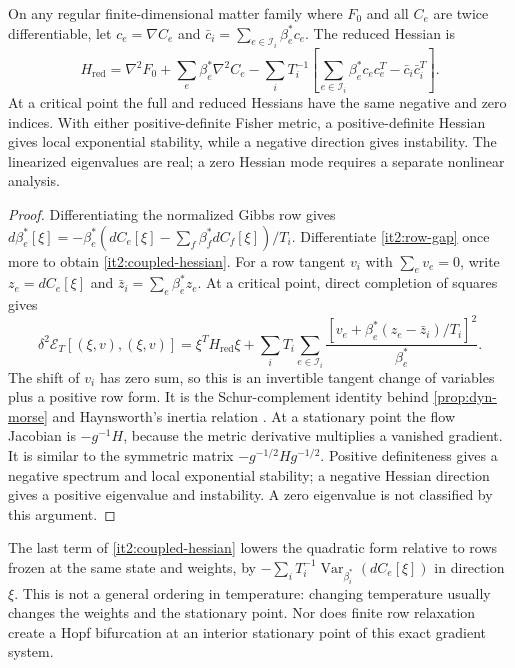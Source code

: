 On any regular finite-dimensional matter family where $F_0$ and all $C_e$ are twice differentiable, let $c_e=\nabla C_e$ and $\bar c_i=\sum_{e\in\mathcal I_i}\beta_e^*c_e$. The reduced Hessian is
\begin{equation}
 H_{\mathrm{red}}=\nabla^2F_0+\sum_e\beta_e^*\nabla^2C_e
 -\sum_iT_i^{-1}\left[
       \sum_{e\in\mathcal I_i}\beta_e^*c_ec_e^T-\bar c_i\bar c_i^T\right].
 \label{it2:coupled-hessian}
\end{equation}
At a critical point the full and reduced Hessians have the same negative and zero indices. With either positive-definite Fisher metric, a positive-definite Hessian gives local exponential stability, while a negative direction gives instability. The linearized eigenvalues are real; a zero Hessian mode requires a separate nonlinear analysis.
\begin{proof}
Differentiating the normalized Gibbs row gives $d\beta_e^*[\xi]=-\beta_e^*(dC_e[\xi]-\sum_f\beta_f^*dC_f[\xi])/T_i$. Differentiate \cref{it2:row-gap} once more to obtain \cref{it2:coupled-hessian}. For a row tangent $v_i$ with $\sum_ev_e=0$, write $z_e=dC_e[\xi]$ and $\bar z_i=\sum_e\beta_e^*z_e$. At a critical point, direct completion of squares gives
\begin{equation}
 \delta^2\mathcal E_T[(\xi,v),(\xi,v)]
 =\xi^TH_{\mathrm{red}}\xi
  +\sum_iT_i\sum_{e\in\mathcal I_i}
       \frac{[v_e+\beta_e^*(z_e-\bar z_i)/T_i]^2}{\beta_e^*}.
 \label{it2:coupled-inertia}
\end{equation}
The shift of $v_i$ has zero sum, so this is an invertible tangent change of variables plus a positive row form. It is the Schur-complement identity behind \cref{prop:dyn-morse} and Haynsworth's inertia relation \citep{Haynsworth1968}. At a stationary point the flow Jacobian is $-g^{-1}H$, because the metric derivative multiplies a vanished gradient. It is similar to the symmetric matrix $-g^{-1/2}Hg^{-1/2}$. Positive definiteness gives a negative spectrum and local exponential stability; a negative Hessian direction gives a positive eigenvalue and instability. A zero eigenvalue is not classified by this argument.
\end{proof}

The last term of \cref{it2:coupled-hessian} lowers the quadratic form relative to rows frozen at the same state and weights, by $-\sum_iT_i^{-1}\operatorname{Var}_{\beta_i^*}(dC_e[\xi])$ in direction $\xi$. This is not a general ordering in temperature: changing temperature usually changes the weights and the stationary point. Nor does finite row relaxation create a Hopf bifurcation at an interior stationary point of this exact gradient system.

